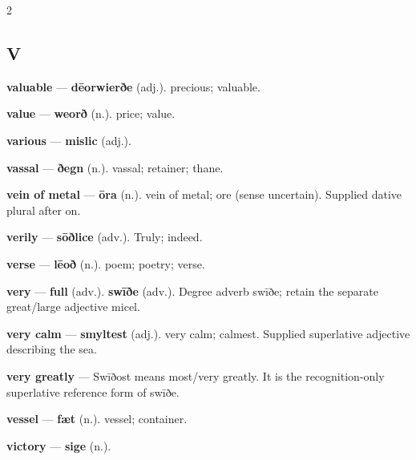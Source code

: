 \begin{multicols}{2}
\subsection*{V}
\textbf{valuable} — \textbf{dēorwierðe} (adj.). precious; valuable.\par
\textbf{value} — \textbf{weorð} (n.). price; value.\par
\textbf{various} — \textbf{mislic} (adj.).\par
\textbf{vassal} — \textbf{ðegn} (n.). vassal; retainer; thane.\par
\textbf{vein of metal} — \textbf{ōra} (n.). vein of metal; ore (sense uncertain). Supplied dative plural after on.\par
\textbf{verily} — \textbf{sōðlice} (adv.). Truly; indeed.\par
\textbf{verse} — \textbf{lēoð} (n.). poem; poetry; verse.\par
\textbf{very} — \textbf{full} (adv.).  \textbf{swīðe} (adv.). Degree adverb swīðe; retain the separate great/large adjective micel.\par
\textbf{very calm} — \textbf{smyltest} (adj.). very calm; calmest. Supplied superlative adjective describing the sea.\par
\textbf{very greatly} — Swīðost means most/very greatly. It is the recognition-only superlative reference form of swīðe.\par
\textbf{vessel} — \textbf{fæt} (n.). vessel; container.\par
\textbf{victory} — \textbf{sige} (n.).\par

\end{multicols}
